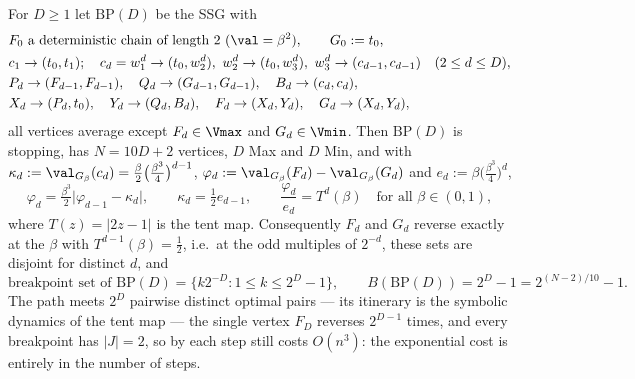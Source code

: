 \begin{theorem}\label{pp:tent}
For $D\ge1$ let $\mathrm{BP}(D)$ be the SSG with
\[
 \begin{aligned}
  &F_0\text{ a deterministic chain of length }2\ (\val=\beta^{2}),\qquad G_0:=t_0,\\
  &c_1\to(t_0,t_1);\quad
   c_d=w^{d}_1\to(t_0,w^{d}_2),\ w^{d}_2\to(t_0,w^{d}_3),\
   w^{d}_3\to(c_{d-1},c_{d-1})\quad(2\le d\le D),\\
  &P_d\to(F_{d-1},F_{d-1}),\quad Q_d\to(G_{d-1},G_{d-1}),\quad B_d\to(c_d,c_d),\\
  &X_d\to(P_d,t_0),\quad Y_d\to(Q_d,B_d),\quad
   F_d\to(X_d,Y_d),\quad G_d\to(X_d,Y_d),
 \end{aligned}
\]
all vertices average except $F_d\in\Vmax$ and $G_d\in\Vmin$. Then $\mathrm{BP}(D)$
is stopping, has $N=10D+2$ vertices, $D$ Max and $D$ Min, and with
$\kappa_d:=\val_{G_\beta}(c_d)=\tfrac{\beta}2\bigl(\tfrac{\beta^{3}}4\bigr)^{d-1}$,
$\varphi_d:=\val_{G_\beta}(F_d)-\val_{G_\beta}(G_d)$ and
$e_d:=\beta\bigl(\tfrac{\beta^{3}}4\bigr)^{d}$,
\[
  \varphi_d=\tfrac{\beta^{3}}2\bigl|\varphi_{d-1}-\kappa_d\bigr|,\qquad
  \kappa_d=\tfrac12e_{d-1},\qquad
  \frac{\varphi_d}{e_d}=T^{d}(\beta)\quad\text{for all }\beta\in(0,1),
\]
where $T(z)=|2z-1|$ is the tent map. Consequently $F_d$ and $G_d$ reverse
exactly at the $\beta$ with $T^{d-1}(\beta)=\tfrac12$, i.e.\ at the odd multiples
of $2^{-d}$, these sets are disjoint for distinct $d$, and
\[
  \text{breakpoint set of }\mathrm{BP}(D)=\{k2^{-D}:1\le k\le2^{D}-1\},\qquad
  B(\mathrm{BP}(D))=2^{D}-1=2^{(N-2)/10}-1 .
\]
The path meets $2^{D}$ pairwise distinct optimal pairs --- its itinerary is the
symbolic dynamics of the tent map --- the single vertex $F_D$ reverses $2^{D-1}$
times, and every breakpoint has $|J|=2$, so by \Cref{pp:step} each step still
costs $O(n^{3})$: the exponential cost is entirely in the number of steps.
\end{theorem}

